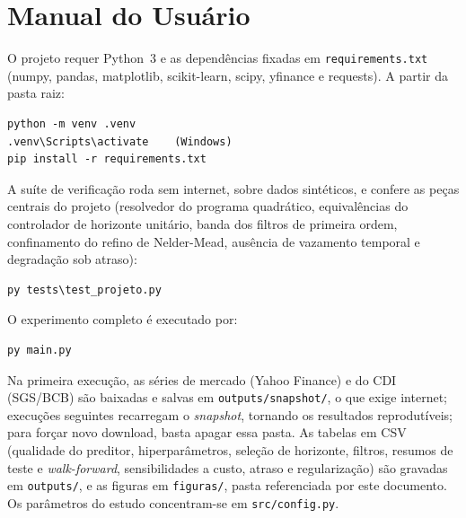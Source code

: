 \documentclass[conference]{IEEEtran}
\begin{document}
\appendices
\section{Manual do Usuário}\label{ap:manual}

O projeto requer Python~3 e as dependências fixadas em \texttt{requirements.txt} (numpy, pandas, matplotlib, scikit-learn, scipy, yfinance e requests). A partir da pasta raiz:
\begin{verbatim}
python -m venv .venv
.venv\Scripts\activate    (Windows)
pip install -r requirements.txt
\end{verbatim}
A suíte de verificação roda sem internet, sobre dados sintéticos, e confere as peças centrais do projeto (resolvedor do programa quadrático, equivalências do controlador de horizonte unitário, banda dos filtros de primeira ordem, confinamento do refino de Nelder-Mead, ausência de vazamento temporal e degradação sob atraso):
\begin{verbatim}
py tests\test_projeto.py
\end{verbatim}
O experimento completo é executado por:
\begin{verbatim}
py main.py
\end{verbatim}
Na primeira execução, as séries de mercado (Yahoo Finance) e do CDI (SGS/BCB) são baixadas e salvas em \texttt{outputs/snapshot/}, o que exige internet; execuções seguintes recarregam o \emph{snapshot}, tornando os resultados reprodutíveis; para forçar novo download, basta apagar essa pasta. As tabelas em CSV (qualidade do preditor, hiperparâmetros, seleção de horizonte, filtros, resumos de teste e \emph{walk-forward}, sensibilidades a custo, atraso e regularização) são gravadas em \texttt{outputs/}, e as figuras em \texttt{figuras/}, pasta referenciada por este documento. Os parâmetros do estudo concentram-se em \texttt{src/config.py}.
\end{document}
